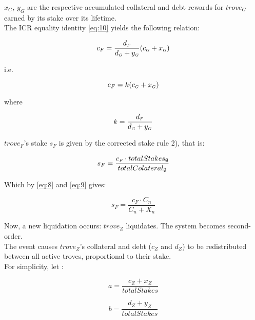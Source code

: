 \documentclass[reqno]{article}
\begin{document}
$x_G$, $y_G$ are the respective accumulated collateral and debt rewards for $trove_G$ earned by its stake over its lifetime.\\

The ICR equality identity \ref{eq:10} yields the following relation:

\begin{equation} 
        c_F=\frac{d_\mathsmaller{F}}{d_\mathsmaller{G}+y_\mathsmaller{G}}(c_\mathsmaller{G}+x_\mathsmaller{G})
\end{equation}

\bigskip
i.e.

\begin{equation} \label{eq:14}
    c_F=k(c_\mathsmaller{G}+x_\mathsmaller{G})
\end{equation}

\bigskip
where

\begin{equation} \label{eq:15}
    k=\frac{d_\mathsmaller{F}}{d_\mathsmaller{G}+y_\mathsmaller{G}}
\end{equation}


\bigskip
$trove_F$’s stake $s_F$ is given by the corrected stake rule 2), that is:

\begin{equation} 
    s_F=\frac{c_\mathsmaller{F} \cdot totalStakes_\emptyset}{totalColateral_\emptyset}
\end{equation}

\bigskip
Which by \ref{eq:8} and \ref{eq:9} gives:

\begin{equation} \label{eq:17}
    s_F=\frac{c_F \cdot C_n}{C_n+X_n}
\end{equation}

\bigskip
Now, a new liquidation occurs: $trove_Z$ liquidates. The system becomes second-order.\\

The event causes $trove_Z$’s collateral and debt ($c_Z$ and $d_Z$) to be redistributed between all active troves, proportional to their stake.\\

For simplicity, let :

\begin{equation} 
    a=\frac{c_Z+x_Z}{totalStakes}
\end{equation}

\begin{equation} 
    b=\frac{d_Z+y_Z}{totalStakes}
\end{equation}
\end{document}
